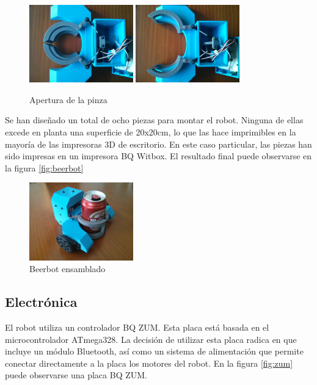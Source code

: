 \begin{figure}[H]
        \centering
        \includegraphics[width=0.4\textwidth]{images/pinzacerrada.jpg}
        \includegraphics[width=0.4\textwidth]{images/pinzaabierta.jpg}
        \caption{Apertura de la pinza}
        \label{fig:pinza}
\end{figure} 
Se han diseñado un total de ocho piezas para montar el robot. Ninguna de ellas excede en planta una superficie de 20x20cm, lo que las hace imprimibles en la mayoría de las impresoras 3D de escritorio. En este caso particular, las piezas han sido impresas en un impresora BQ Witbox. El resultado final puede observarse en la figura \ref{fig:beerbot}

\begin{figure}[H]
        \centering
        \includegraphics[width=0.4\textwidth]{images/beerbot.png}
        \caption{Beerbot ensamblado}
        \label{fig:abajo}
\end{figure} 

\subsection{Electrónica}

El robot utiliza un controlador BQ ZUM. Esta placa está basada en el microcontrolador ATmega328. La decisión de utilizar esta placa radica en que incluye un módulo Bluetooth, así como un sistema de alimentación que permite conectar directamente a la placa los motores del robot. En la figura \ref{fig:zum} puede observarse una placa BQ ZUM.

